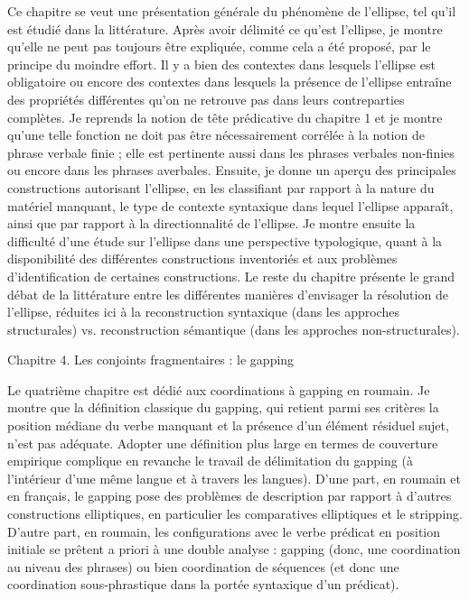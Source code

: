 Ce chapitre se veut une présentation générale du phénomène de l'ellipse, tel qu'il est étudié dans la littérature. Après avoir délimité ce qu'est l'ellipse, je montre qu'elle ne peut pas toujours être expliquée, comme cela a été proposé, par le principe du moindre effort. Il y a bien des contextes dans lesquels l'ellipse est obligatoire ou encore des contextes dans lesquels la présence de l'ellipse entraîne des propriétés différentes qu'on ne retrouve pas dans leurs contreparties complètes. Je reprends la notion de tête prédicative du chapitre 1 et je montre qu'une telle fonction ne doit pas être nécessairement corrélée à la notion de phrase verbale finie ; elle est pertinente aussi dans les phrases verbales non-finies ou encore dans les phrases averbales. Ensuite, je donne un aperçu des principales constructions autorisant l'ellipse, en les classifiant par rapport à la nature du matériel manquant, le type de contexte syntaxique dans lequel l'ellipse apparaît, ainsi que par rapport à la directionnalité de l'ellipse. Je montre ensuite la difficulté d'une étude sur l'ellipse dans une perspective typologique, quant à la disponibilité des différentes constructions inventoriés et aux problèmes d'identification de certaines constructions. Le reste du chapitre présente le grand débat de la littérature entre les différentes manières d'envisager la résolution de l'ellipse, réduites ici à la reconstruction syntaxique (dans les approches structurales) vs. reconstruction sémantique (dans les approches non-structurales).

Chapitre 4. Les conjoints fragmentaires : le gapping

Le quatrième chapitre est dédié aux coordinations à gapping en roumain. Je montre que la définition classique du gapping, qui retient parmi ses critères la position médiane du verbe manquant et la présence d'un élément résiduel sujet, n'est pas adéquate. Adopter une définition plus large en termes de couverture empirique complique en revanche le travail de délimitation du gapping (à l'intérieur d'une même langue et à travers les langues). D'une part, en roumain et en français, le gapping pose des problèmes de description par rapport à d'autres constructions elliptiques, en particulier les comparatives elliptiques et le stripping. D'autre part, en roumain, les configurations avec le verbe prédicat en position initiale se prêtent a priori à une double analyse : gapping (donc, une coordination au niveau des phrases) ou bien coordination de séquences (et donc une coordination sous-phrastique dans la portée syntaxique d'un prédicat). 

